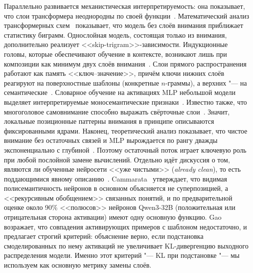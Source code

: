 Параллельно развивается механистическая интерпретируемость: она
показывает, что слои трансформера неоднородны по своей
функции~\cite{olah2020zoom,rai2024review}. Математический анализ
трансформерных схем~\cite{elhage2021framework} показывает, что модель
без слоёв внимания приближает статистику биграмм. Однослойная модель,
состоящая только из внимания, дополнительно реализует
<<skip-trigram>>-зависимости. Индукционные головы, которые
обеспечивают обучение в контексте, возникают лишь при композиции как
минимум двух слоёв внимания~\cite{olsson2022induction}. Слои прямого
распространения работают как память <<ключ--значение>>, причём ключи
нижних слоёв реагируют на поверхностные шаблоны (конкретные
$n$-граммы), а верхних "--- на семантические~\cite{geva2021ffn}.
Словарное обучение на активациях MLP небольшой модели выделяет
интерпретируемые моносемантические признаки~\cite{bricken2023monosemanticity}.
Известно также, что многоголовое самовнимание способно выражать
свёрточные слои~\cite{cordonnier2020relationship}. Значит, локальные
позиционные паттерны внимания в принципе описываются фиксированными
ядрами. Наконец, теоретический анализ
показывает, что чистое внимание без остаточных связей и MLP
вырождается по рангу дважды экспоненциально с
глубиной~\cite{dong2021attention}. Поэтому остаточный поток играет
ключевую роль при любой послойной замене вычислений.
Отдельно идёт дискуссия о том, являются ли обученные нейросети
<<уже чистыми>> (\emph{already clean}), то есть поддающимися явному
описанию~\cite{cammarata_clean,gao_notclean,lissack_clean,ibm_clean}.
Cammarata~\cite{cammarata_clean} утверждает, что видимая
полисемантичность нейронов в основном объясняется не суперпозицией, а
<<рекурсивным обобщением>> связанных понятий, и по предварительной
оценке около 90\% <<полюсов>> нейронов Qwen3-32B (положительная или отрицательная сторона активации) имеют одну основную функцию.
Gao~\cite{gao_notclean} возражает, что совпадения активирующих примеров с
шаблоном недостаточно, и предлагает строгий критерий: объяснение
верно, если подстановка смоделированных по нему активаций не
увеличивает KL-дивергенцию выходного распределения модели. Именно этот
критерий "--- KL при подстановке "--- мы используем как основную
метрику замены слоёв.

